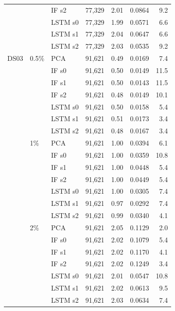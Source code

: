 \begin{scriptsize}
\begin{longtable}{lllrrrr}
 &  & IF s2 & 77,329 & 2.01 & 0.0864 & 9.2 \\
 &  & LSTM s0 & 77,329 & 1.99 & 0.0571 & 6.6 \\
 &  & LSTM s1 & 77,329 & 2.04 & 0.0647 & 6.6 \\
 &  & LSTM s2 & 77,329 & 2.03 & 0.0535 & 9.2 \\
\midrule
DS03 & 0.5\% & PCA & 91,621 & 0.49 & 0.0169 & 7.4 \\
 &  & IF s0 & 91,621 & 0.50 & 0.0149 & 11.5 \\
 &  & IF s1 & 91,621 & 0.50 & 0.0143 & 11.5 \\
 &  & IF s2 & 91,621 & 0.48 & 0.0149 & 10.1 \\
 &  & LSTM s0 & 91,621 & 0.50 & 0.0158 & 5.4 \\
 &  & LSTM s1 & 91,621 & 0.51 & 0.0173 & 3.4 \\
 &  & LSTM s2 & 91,621 & 0.48 & 0.0167 & 3.4 \\
 & 1\% & PCA & 91,621 & 1.00 & 0.0394 & 6.1 \\
 &  & IF s0 & 91,621 & 1.00 & 0.0359 & 10.8 \\
 &  & IF s1 & 91,621 & 1.00 & 0.0448 & 5.4 \\
 &  & IF s2 & 91,621 & 1.00 & 0.0449 & 5.4 \\
 &  & LSTM s0 & 91,621 & 1.00 & 0.0305 & 7.4 \\
 &  & LSTM s1 & 91,621 & 0.97 & 0.0292 & 7.4 \\
 &  & LSTM s2 & 91,621 & 0.99 & 0.0340 & 4.1 \\
 & 2\% & PCA & 91,621 & 2.05 & 0.1129 & 2.0 \\
 &  & IF s0 & 91,621 & 2.02 & 0.1079 & 5.4 \\
 &  & IF s1 & 91,621 & 2.02 & 0.1170 & 4.1 \\
 &  & IF s2 & 91,621 & 2.02 & 0.1249 & 3.4 \\
 &  & LSTM s0 & 91,621 & 2.01 & 0.0547 & 10.8 \\
 &  & LSTM s1 & 91,621 & 2.02 & 0.0613 & 9.5 \\
 &  & LSTM s2 & 91,621 & 2.03 & 0.0634 & 7.4 \\
\end{longtable}
\end{scriptsize}
